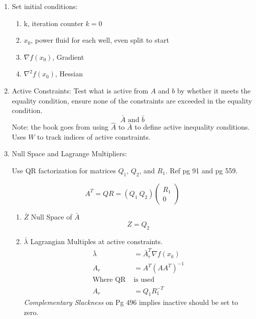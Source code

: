 \documentclass{article}
\begin{document}
\begin{enumerate}
    \item Set initial conditions:
    \begin{enumerate}
        \item k, iteration counter $k=0$
        \item $x_{0}$, power fluid for each well, even split to start
        \item $\nabla f(x_{0})$, Gradient
        \item $\nabla^2 f(x_{0})$, Hessian
    \end{enumerate}
    
    \item Active Constraints: Test what is active from $A$ and $b$ by whether it meets the equality condition, ensure none of the constraints are exceeded in the equality condition. 
    $$\bar{A} \text{ and } \bar{b}$$ 
    Note: the book goes from using $\hat{A}$ to $\bar{A}$ to define active inequality conditions. Uses $W$ to track indices of active constraints.
    
    \item Null Space and Lagrange Multipliers:
    
    Use QR factorization for matrices $Q_{1}$, $Q_{2}$, and $R_{1}$. Ref pg 91 and pg 559.

    \begin{equation*}
        A^T = QR = (Q_1 \: Q_2) \begin{pmatrix} R_1 \\ 0 \end{pmatrix}
    \end{equation*}
    
    \begin{enumerate}
        \item $\bar{Z}$ Null Space of $\bar{A}$
            $$Z = Q_{2}$$

        \item $\bar{\lambda}$ Lagrangian Multiples at active constraints.
        \begin{equation*}
        \begin{aligned}
            \bar{\lambda} & = \bar{A}^{T}_{r}\nabla f(x_{k}) \\
            A_{r} & = A^{T}(AA^{T})^{-1} \\
            \text{Where QR } & \text{is used} \\
            A_{r} & = Q_{1}R_{1}^{-T}
        \end{aligned}
        \end{equation*}
        \textit{Complementary Slackness} on Pg 496 implies inactive should be set to zero.
    \end{enumerate}
    

\end{enumerate}
\end{document}
